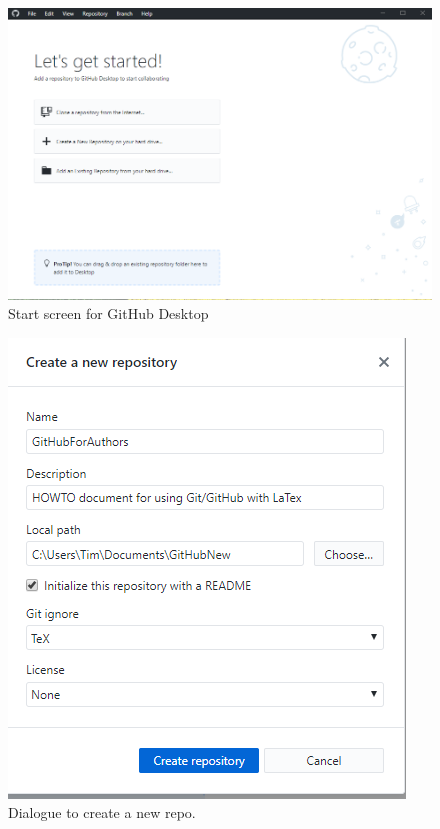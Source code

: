 \documentclass[a4paper, 12pt]{article}
\begin{document}
\begin{figure}
\centering
\includegraphics[width=\linewidth]{startscreen}
\caption{Start screen for GitHub Desktop}
\label{startscreen}
\end{figure}

\begin{figure}
\centering
\includegraphics{NewRepo}
\caption{Dialogue to create a new repo.}
\label{newrepo}
\end{figure}
\end{document}
